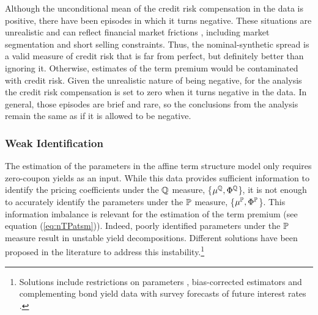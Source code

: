 {Although the unconditional mean of the credit risk compensation in the data is positive, there have been %
episodes in which it turns %
negative.
These situations are unrealistic and can reflect financial market frictions \citep{DuSchreger:2016JoF}, including market segmentation %
and short selling constraints.
Thus, the nominal-synthetic spread is a valid measure of credit risk that is far from perfect, but
definitely better than ignoring it. 
Otherwise, estimates of the term premium would be contaminated with credit risk.
Given the unrealistic nature of being negative, for the analysis the credit risk compensation is set to zero when %
it turns negative in the data. 
In general, those episodes are brief and rare, so the %
conclusions from the analysis remain the same as if it is allowed to be negative.


\subsubsection{Weak Identification} \label{sec:Identification}
\iftoggle{toclinks}{\gototoc}{} %

The estimation of the parameters in the affine term structure model only  requires zero-coupon yields as an input.
While this data provides sufficient information to identify 
the pricing coefficients under the \(\mathbb{Q}\) measure,
\{\(\mu^{\mathbb{Q}}, \Phi^{\mathbb{Q}}\)\}, it is not enough to accurately identify the parameters under the \(\mathbb{P}\) measure, %
\{\(\mu^{\mathbb{P}}, \Phi^{\mathbb{P}}\)\}. 
This information imbalance %
is relevant for the estimation of the term premium (see equation (\ref{eq:nTPatsm})). Indeed, poorly identified parameters under the \(\mathbb{P}\) measure result in unstable yield decompositions.
Different solutions have been proposed in the literature to address 
this instability.\footnote{ Solutions include restrictions on parameters \citep{Duffee:2010}, bias-corrected estimators \citep{BRW:2012} and complementing bond yield data with survey forecasts of future interest rates \citep{KimWright:2005,KimOrphanides:2012}.} 

}
